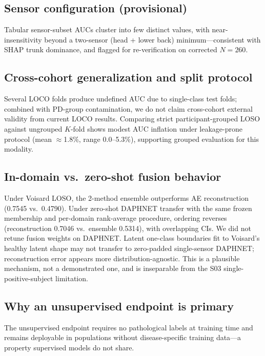 \documentclass[11pt,a4paper]{article}
\begin{document}
\subsection{Sensor configuration (provisional)}

Tabular sensor-subset AUCs cluster into few distinct values, with near-insensitivity beyond a two-sensor (head + lower back) minimum---consistent with SHAP trunk dominance, and flagged for re-verification on corrected $N=260$.

\subsection{Cross-cohort generalization and split protocol}

Several LOCO folds produce undefined AUC due to single-class test folds; combined with PD-group contamination, we do not claim cross-cohort external validity from current LOCO results. Comparing strict participant-grouped LOSO against ungrouped $K$-fold shows modest AUC inflation under leakage-prone protocol (mean $\approx$1.8\%, range 0.0--5.3\%), supporting grouped evaluation for this modality.

\subsection{In-domain vs.\ zero-shot fusion behavior}

Under Voisard LOSO, the 2-method ensemble outperforms AE reconstruction (0.7545 vs.\ 0.4790). Under zero-shot DAPHNET transfer with the same frozen membership and per-domain rank-average procedure, ordering reverses (reconstruction 0.7046 vs.\ ensemble 0.5314), with overlapping CIs. We did not retune fusion weights on DAPHNET. Latent one-class boundaries fit to Voisard's healthy latent shape may not transfer to zero-padded single-sensor DAPHNET; reconstruction error appears more distribution-agnostic. This is a plausible mechanism, not a demonstrated one, and is inseparable from the S03 single-positive-subject limitation.

\subsection{Why an unsupervised endpoint is primary}

The unsupervised endpoint requires no pathological labels at training time and remains deployable in populations without disease-specific training data---a property supervised models do not share.
\end{document}
